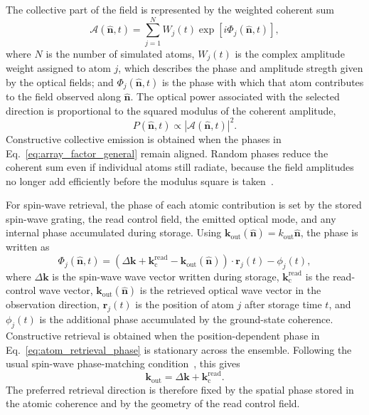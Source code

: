The collective part of the field is represented by the weighted coherent sum
\begin{equation}
    \mathcal{A}(\hat{\mathbf n},t)
    =
    \sum_{j=1}^{N}
    W_j(t)
    \exp\left[
        i\Phi_j(\hat{\mathbf n},t)
    \right],
    \label{eq:array_factor_general}
\end{equation}
where $N$ is the number of simulated atoms, $W_j(t)$ is the complex amplitude weight assigned to atom $j$, which describes the phase and amplitude stregth given by the optical fields;  and $\Phi_j(\hat{\mathbf n},t)$ is the phase with which that atom contributes to the field observed along $\hat{\mathbf n}$. The optical power associated with the selected direction is proportional to the squared modulus of the coherent amplitude,
\begin{equation}
    P(\hat{\mathbf n},t)
    \propto
    \left|
    \mathcal{A}(\hat{\mathbf n},t)
    \right|^2 .
    \label{eq:array_factor_power}
\end{equation}
Constructive collective emission is obtained when the phases in Eq.~\eqref{eq:array_factor_general} remain aligned. Random phases reduce the coherent sum even if individual atoms still radiate, because the field amplitudes no longer add efficiently before the modulus square is taken~\cite{AntenaCourseNotes,PsiL-odamIFm_GorshkovEtAl_2007}.

For spin-wave retrieval, the phase of each atomic contribution is set by the stored spin-wave grating, the read control field, the emitted optical mode, and any internal phase accumulated during storage. Using $\mathbf{k}_{\mathrm{out}}(\hat{\mathbf n})=k_{\mathrm{out}}\hat{\mathbf n}$, the phase is written as
\begin{equation}
    \Phi_j(\hat{\mathbf n},t)
    =
    \left(
        \Delta\mathbf{k}
        +
        \mathbf{k}_{\mathrm{c}}^{\mathrm{read}}
        -
        \mathbf{k}_{\mathrm{out}}(\hat{\mathbf n})
    \right)
    \cdot
    \mathbf{r}_j(t)
    -
    \phi_j(t),
    \label{eq:atom_retrieval_phase}
\end{equation}
where $\Delta\mathbf{k}$ is the spin-wave wave vector written during storage, $\mathbf{k}_{\mathrm{c}}^{\mathrm{read}}$ is the read-control wave vector, $\mathbf{k}_{\mathrm{out}}(\hat{\mathbf n})$ is the retrieved optical wave vector in the observation direction, $\mathbf{r}_j(t)$ is the position of atom $j$ after storage time $t$, and $\phi_j(t)$ is the additional phase accumulated by the ground-state coherence. Constructive retrieval is obtained when the position-dependent phase in Eq.~\eqref{eq:atom_retrieval_phase} is stationary across the ensemble. Following the usual spin-wave phase-matching condition~\cite{PsiL-odamIFm_GorshkovEtAl_2007}, this gives
\begin{equation}
    \mathbf{k}_{\mathrm{out}}
    =
    \Delta\mathbf{k}
    +
    \mathbf{k}_{\mathrm{c}}^{\mathrm{read}}.
    \label{eq:simulation_phase_matching}
\end{equation}
The preferred retrieval direction is therefore fixed by the spatial phase stored in the atomic coherence and by the geometry of the read control field.

